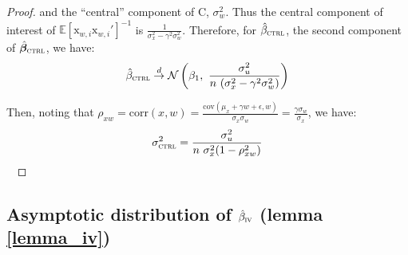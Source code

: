 \documentclass[usletter, 12pt]{article}
\begin{document}
\begin{proof}
				and the ``central'' component of C, $\sigma_{w}^{2}$. Thus the central component of interest of $\mathbb{E}[\text{x}_{w, i}\text{x}_{w, i}']^{-1}$ is $\frac{1}{\sigma_{x}^{2} - \gamma^{2}\sigma_{w}^{2}}$. Therefore, for $\hat{\beta}_{\textsc{ctrl}}$, the second component of $\hat{\bm{\beta}}_{\textsc{ctrl}}$, we have:
				\begin{equation}
						\hat{\beta}_{\textsc{ctrl}} \overset{d}{\to}
							 \mathcal{N}\left( \beta_1 , \ \dfrac{\sigma_{u}^{2}}{n \ (\sigma_{x}^{2} - \gamma^{2}\sigma_{w}^{2})} \right) 
				\end{equation}
				
				Then, noting that $\rho_{xw} =  \text{corr}(x, w) = \frac{ \text{cov}(\mu_{x} + \gamma w + \epsilon, w)}{\sigma_{x}\sigma_{w}} = \frac{\gamma\sigma_{w}}{\sigma_{x}}$, we have:
				\[
					\sigma_{\textsc{ctrl}}^{2} = \dfrac{\sigma_{u}^{2}}{n \ \sigma_{x}^{2}(1 - \rho_{xw}^{2})}
				\]
				~
				\end{proof}
	

\subsection{Asymptotic distribution of $\hat{\beta}_{\textsc{iv}}$ (lemma \ref{lemma_iv})}
	
\end{document}
